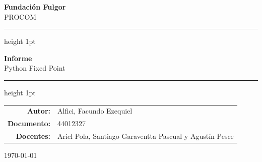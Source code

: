 \documentclass[12pt, a4paper]{article}
\newcommand{\tema}{Python Fixed Point}
\newcommand{\titulotrabajo}{Informe}
\newcommand{\autor}{Alfici, Facundo Ezequiel}
\newcommand{\documento}{44012327}
\newcommand{\curso}{PROCOM}
\newcommand{\fundacion}{Fundación Fulgor}
\newcommand{\fecha}{\today}
\begin{document}
\thispagestyle{empty}

\begin{center}   %

    {\Large \textbf{\fundacion}}\\[0.3cm]      %
    {\large \curso}

    \vspace{1.5cm}   %


    \hrule height 1pt   %
    \vspace{0.4cm}

    {\LARGE \textbf{\titulotrabajo}}\\[0.3cm]
    {\large \tema}

    \vspace{0.4cm}
    \hrule height 1pt

    \vspace{2.5cm}

    \begin{tabular}{r l}   %
        \textbf{Autor:}   & \autor\\[0.2cm]
        \textbf{Documento:}  & \documento\\[0.2cm]
        \textbf{Docentes:} &  Ariel Pola, Santiago Garaventta Pascual y Agustín Pesce\\
    \end{tabular}

    \vspace{3cm}

    {\large \fecha}

\end{center}

\newpage

\tableofcontents   %
\newpage
\end{document}
